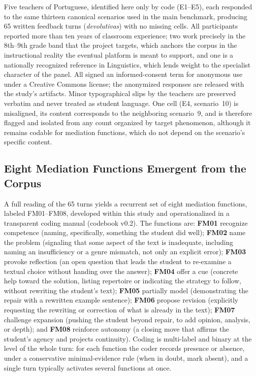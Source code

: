 \documentclass{sbc2023}%
\begin{document}
Five teachers of Portuguese, identified here only by code (E1--E5), each responded to the same thirteen canonical scenarios used in the main benchmark, producing 65 written feedback turns (\textit{devolutivas}) with no missing cells. All participants reported more than ten years of classroom experience; two work precisely in the 8th--9th grade band that the project targets, which anchors the corpus in the instructional reality the eventual platform is meant to support, and one is a nationally recognized reference in Linguistics, which lends weight to the specialist character of the panel. All signed an informed-consent term for anonymous use under a Creative Commons license; the anonymized responses are released with the study's artifacts. Minor typographical slips by the teachers are preserved verbatim and never treated as student language. One cell (E4, scenario~10) is misaligned, its content corresponds to the neighboring scenario~9, and is therefore flagged and isolated from any count organized by target phenomenon, although it remains codable for mediation functions, which do not depend on the scenario's specific content.

\subsection{Eight Mediation Functions Emergent from the Corpus}

A full reading of the 65 turns yields a recurrent set of eight mediation functions, labeled FM01--FM08, developed within this study and operationalized in a transparent coding manual (codebook v0.2). The functions are: \textbf{FM01} recognize competence (naming, specifically, something the student did well); \textbf{FM02} name the problem (signaling that some aspect of the text is inadequate, including naming an insufficiency or a genre mismatch, not only an explicit error); \textbf{FM03} provoke reflection (an open question that leads the student to re-examine a textual choice without handing over the answer); \textbf{FM04} offer a cue (concrete help toward the solution, listing repertoire or indicating the strategy to follow, without rewriting the student's text); \textbf{FM05} partially model (demonstrating the repair with a rewritten example sentence); \textbf{FM06} propose revision (explicitly requesting the rewriting or correction of what is already in the text); \textbf{FM07} challenge expansion (pushing the student beyond repair, to add opinion, analysis, or depth); and \textbf{FM08} reinforce autonomy (a closing move that affirms the student's agency and projects continuity). Coding is multi-label and binary at the level of the whole turn: for each function the coder records presence or absence, under a conservative minimal-evidence rule (when in doubt, mark absent), and a single turn typically activates several functions at once.
\end{document}
